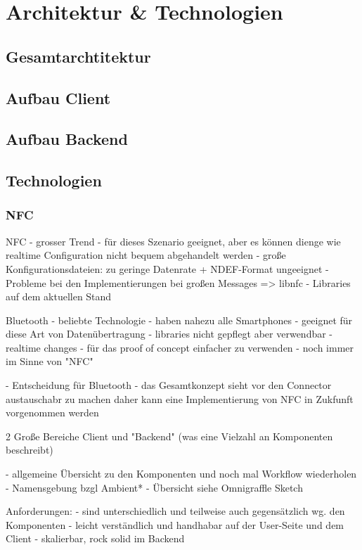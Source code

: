 \chapter{Architektur & Technologien}


\section{Gesamtarchtitektur}

\section{Aufbau Client}
\section{Aufbau Backend}


\section{Technologien}

\subsection{NFC}
NFC
- grosser Trend 
- für dieses Szenario geeignet, aber es können dienge wie realtime Configuration nicht bequem abgehandelt werden 
- große Konfigurationsdateien: zu geringe Datenrate + NDEF-Format ungeeignet 
- Probleme bei den Implementierungen bei großen Messages => libnfc
- Libraries auf dem aktuellen Stand

Bluetooth
- beliebte Technologie 
- haben nahezu alle Smartphones
- geeignet für diese Art von Datenübertragung 
- libraries nicht gepflegt aber verwendbar
- realtime changes
- für das proof of concept einfacher zu verwenden
- noch immer im Sinne von "NFC"

- Entscheidung für Bluetooth
- das Gesamtkonzept sieht vor den Connector austauschabr zu machen daher kann eine Implementierung von NFC in Zukfunft vorgenommen werden


2 Große Bereiche Client und "Backend" (was eine Vielzahl an Komponenten beschreibt)

- allgemeine Übersicht zu den Komponenten und noch mal Workflow wiederholen
- Namensgebung bzgl Ambient*
- Übersicht siehe Omnigraffle Sketch 

Anforderungen:
- sind unterschiedlich und teilweise auch gegensätzlich wg. den Komponenten 
- leicht verständlich und handhabar auf der User-Seite und dem Client 
- skalierbar, rock solid im Backend


